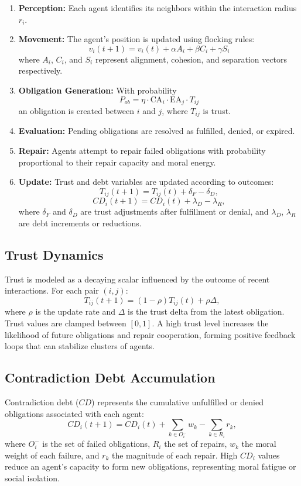 \documentclass[11pt]{article}
\begin{document}
\begin{enumerate}
  \item \textbf{Perception:} Each agent identifies its neighbors within the interaction radius $r_i$.
  \item \textbf{Movement:} The agent’s position is updated using flocking rules:
  \[
  v_i(t+1) = v_i(t) + \alpha A_i + \beta C_i + \gamma S_i
  \]
  where $A_i$, $C_i$, and $S_i$ represent alignment, cohesion, and separation vectors respectively.
  \item \textbf{Obligation Generation:} With probability
  \[
  P_{ob} = \eta \cdot \text{CA}_i \cdot \text{EA}_j \cdot T_{ij}
  \]
  an obligation is created between $i$ and $j$, where $T_{ij}$ is trust.
  \item \textbf{Evaluation:} Pending obligations are resolved as fulfilled, denied, or expired.
  \item \textbf{Repair:} Agents attempt to repair failed obligations with probability proportional to their repair capacity and moral energy.
  \item \textbf{Update:} Trust and debt variables are updated according to outcomes:
  \[
  T_{ij}(t+1) = T_{ij}(t) + \delta_F - \delta_D,
  \]
  \[
  CD_i(t+1) = CD_i(t) + \lambda_D - \lambda_R,
  \]
  where $\delta_F$ and $\delta_D$ are trust adjustments after fulfillment or denial, and $\lambda_D$, $\lambda_R$ are debt increments or reductions.
\end{enumerate}

\subsection{Trust Dynamics}

Trust is modeled as a decaying scalar influenced by the outcome of recent interactions. For each pair $(i,j)$:
\[
T_{ij}(t+1) = (1 - \rho)T_{ij}(t) + \rho \Delta,
\]
where $\rho$ is the update rate and $\Delta$ is the trust delta from the latest obligation. Trust values are clamped between $[0,1]$. A high trust level increases the likelihood of future obligations and repair cooperation, forming positive feedback loops that can stabilize clusters of agents.

\subsection{Contradiction Debt Accumulation}

Contradiction debt ($CD$) represents the cumulative unfulfilled or denied obligations associated with each agent:
\[
CD_i(t+1) = CD_i(t) + \sum_{k \in O_i^-} w_k - \sum_{k \in R_i} r_k,
\]
where $O_i^-$ is the set of failed obligations, $R_i$ the set of repairs, $w_k$ the moral weight of each failure, and $r_k$ the magnitude of each repair.  
High $CD_i$ values reduce an agent’s capacity to form new obligations, representing moral fatigue or social isolation.
\end{document}
